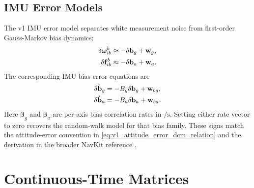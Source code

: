 \subsection{IMU Error Models}

The v1 IMU error model separates white measurement noise from first-order
Gauss-Markov bias dynamics:
\begin{align}
\delta\boldsymbol{\omega}_{ib}^{b}
&\approx
-
\delta\mathbf{b}_g
+
\mathbf{w}_g,\\
\delta\mathbf{f}_{ib}^{b}
&\approx
-
\delta\mathbf{b}_a
+
\mathbf{w}_a.
\end{align}
The corresponding IMU bias error equations are
\begin{align}
\delta\dot{\mathbf{b}}_g
&=
-
B_g\delta\mathbf{b}_g
+
\mathbf{w}_{bg},\\
\delta\dot{\mathbf{b}}_a
&=
-
B_a\delta\mathbf{b}_a
+
\mathbf{w}_{ba}.
\end{align}
Here $\boldsymbol{\beta}_g$ and $\boldsymbol{\beta}_a$ are per-axis bias
correlation rates in $\si{\per\second}$. Setting either rate vector to zero
recovers the random-walk model for that bias family.
These signs match the attitude-error convention in
\cref{eq:v1_attitude_error_dcm_relation} and the derivation in the broader
NavKit reference \cite{groves2013,sola2018}.

\section{Continuous-Time Matrices}

